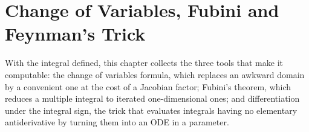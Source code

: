 \chapter{Change of Variables, Fubini and Feynman's Trick}
\label{ch:change_of_variables}

With the integral defined, this chapter collects the three tools that make it computable: the
change of variables formula, which replaces an awkward domain by a convenient one at the cost of
a Jacobian factor; Fubini's theorem, which reduces a multiple integral to iterated
one-dimensional ones; and differentiation under the integral sign, the trick that evaluates
integrals having no elementary antiderivative by turning them into an ODE in a parameter.





